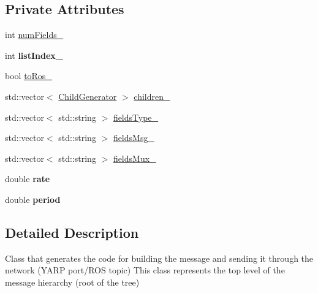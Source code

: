\subsection*{Private Attributes}
\begin{DoxyCompactItemize}
\item 
int \hyperlink{classBottleCreatorGenerator_ab2b5f38e2b44b14d26ca3eebcb42648a}{num\-Fields\-\_\-}
\item 
\hypertarget{classBottleCreatorGenerator_ad5c777ad4890fc3dfd9b74b67a9e0019}{int {\bfseries list\-Index\-\_\-}}\label{classBottleCreatorGenerator_ad5c777ad4890fc3dfd9b74b67a9e0019}

\item 
bool \hyperlink{classBottleCreatorGenerator_aa20440ff74cb4ee807221653872611dd}{to\-Ros\-\_\-}
\item 
std\-::vector$<$ \hyperlink{classChildGenerator}{Child\-Generator} $>$ \hyperlink{classBottleCreatorGenerator_a1e0f07071fec2afe0c6f0ec1f9324ba9}{children\-\_\-}
\item 
std\-::vector$<$ std\-::string $>$ \hyperlink{classBottleCreatorGenerator_abad8d5103182e56c2c9b96cab85c0602}{fields\-Type\-\_\-}
\item 
std\-::vector$<$ std\-::string $>$ \hyperlink{classBottleCreatorGenerator_a805fb77a1f16e0816b639ae06cbca361}{fields\-Msg\-\_\-}
\item 
std\-::vector$<$ std\-::string $>$ \hyperlink{classBottleCreatorGenerator_a5bd421cf5bc8157b46ef8d6522bc79e2}{fields\-Mux\-\_\-}
\item 
\hypertarget{classBottleCreatorGenerator_a20a7016668f375ed392d25984b732e23}{double {\bfseries rate}}\label{classBottleCreatorGenerator_a20a7016668f375ed392d25984b732e23}

\item 
\hypertarget{classBottleCreatorGenerator_a856a5521bdb4813a09f0bdfcd51354ec}{double {\bfseries period}}\label{classBottleCreatorGenerator_a856a5521bdb4813a09f0bdfcd51354ec}

\end{DoxyCompactItemize}


\subsection{Detailed Description}
Class that generates the code for building the message and sending it through the network (Y\-A\-R\-P port/\-R\-O\-S topic) This class represents the top level of the message hierarchy (root of the tree) 

